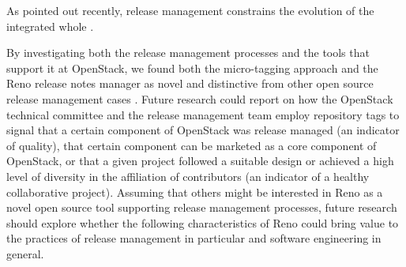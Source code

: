 \documentclass[dvipsnames]{bmcart}
\theoremstyle{definition}
\begin{document}
As pointed out recently, release management constrains the evolution of the integrated whole  \cite[pp 4]{poo2016release}.
 
 




By investigating both the release management processes and the tools that support it at OpenStack, we found both the micro-tagging approach and the Reno release notes manager as novel and distinctive from other open source release management cases \cite[c.f.,][]{michlmayr2015and,Poo-Caamano2017}. Future research could report on how the OpenStack technical committee and the release management team employ repository tags to signal that a certain component of OpenStack was release managed (an indicator of quality), that certain component can be marketed as a core component of OpenStack, or that a given project followed a suitable design or achieved a high level of diversity in the affiliation of contributors (an indicator of a healthy collaborative project).  Assuming that others might be interested in Reno as a novel open source tool supporting release management processes, future research should explore whether the following characteristics of Reno could bring value to the practices of release management in particular and software engineering in general. 
\end{document}
